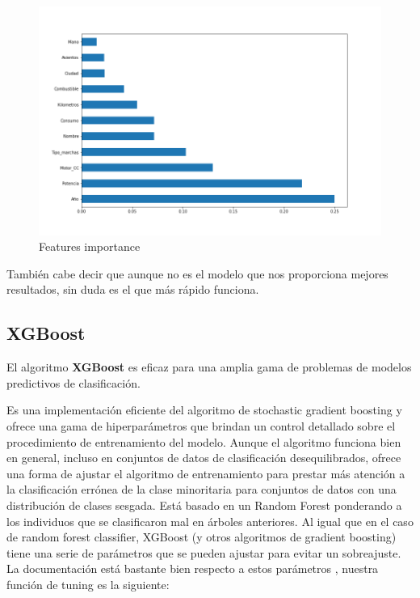 \documentclass[12pt,twoside]{report}
\begin{document}
\begin{figure}[H]
\includegraphics[width=\textwidth]{../notebooks/figures/feature_importances_rfc_1.png}
\caption{Features importance}
\label{fig:rfc_features}
\end{figure} 

También cabe decir que aunque no es el modelo que nos proporciona mejores resultados, sin duda es el que más rápido funciona.

\subsection*{XGBoost}

El algoritmo \textbf{XGBoost}\cite{xgboost} es eficaz para una amplia gama de problemas de modelos predictivos de clasificación.

Es una implementación eficiente del algoritmo de stochastic gradient boosting y ofrece una gama de hiperparámetros que brindan un control detallado sobre el procedimiento de entrenamiento del modelo. Aunque el algoritmo funciona bien en general, incluso en conjuntos de datos de clasificación desequilibrados, ofrece una forma de ajustar el algoritmo de entrenamiento para prestar más atención a la clasificación errónea de la clase minoritaria para conjuntos de datos con una distribución de clases sesgada. Está basado en un Random Forest ponderando a los individuos que se clasificaron mal en árboles anteriores. Al igual que en el caso de random forest classifier, XGBoost (y otros algoritmos de gradient boosting) tiene una serie de parámetros que se pueden ajustar para evitar un sobreajuste. La documentación está bastante bien respecto a estos parámetros \cite{xgboost-tuning}, nuestra función de tuning es la siguiente:\\
\\
\end{document}
